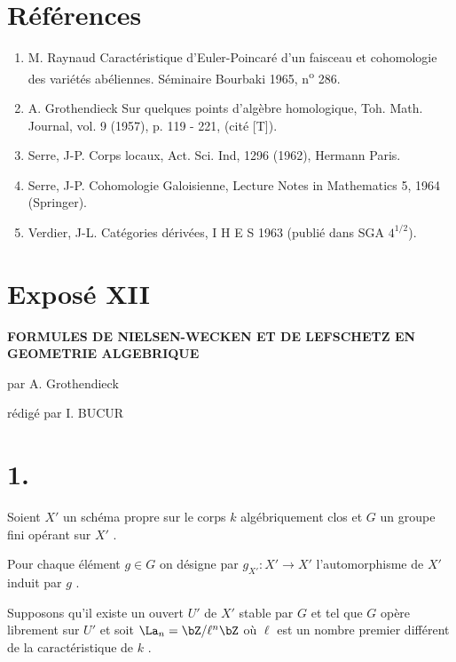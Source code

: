\section*{Références}

\begin{enumerate}
\item[{[1]}] M.
Raynaud Caractéristique d'Euler-Poincaré d'un faisceau et cohomologie des variétés abéliennes. Séminaire Bourbaki 1965, n\textsuperscript{o} 286.
\item[{[2]}] A. Grothendieck Sur quelques points d'algèbre homologique, Toh. Math. Journal, vol. 9 (1957), p. 119 - 221, (cité [T]).
\item[{[3]}] Serre, J-P. Corps locaux, Act. Sci. Ind, 1296 (1962), Hermann Paris.
\item[{[4]}] Serre, J-P. Cohomologie Galoisienne, Lecture Notes in Mathematics 5, 1964 (Springer).
\item[{[5]}] Verdier, J-L. Catégories dérivées, I H E S 1963 (publié dans SGA $4^{1/2}$).
\end{enumerate}

\renewcommand{\EP}{\operatorname{EP}}
\renewcommand{\Ob}{\operatorname{ob}}
\section*{Exposé XII}

\begin{center}
\Large\bf
FORMULES DE NIELSEN-WECKEN ET DE LEFSCHETZ EN GEOMETRIE ALGEBRIQUE
\end{center}

\begin{center}
par A. Grothendieck

rédigé par I. BUCUR
\end{center}

\bigskip

\section*{1.}
Soient $X'$ un schéma propre sur le corps $k$ algébriquement clos et $G$ un groupe fini opérant sur $X'$ .

Pour chaque élément $g \in G$ on désigne par $g_{X'} : X' \to X'$ l'automorphisme de $X'$ induit par $g$ .

Supposons qu'il existe un ouvert $U'$ de $X'$ stable par $G$ et tel que $G$ opère librement sur $U'$ et soit $\La_n = \bZ/\ell^n\bZ$ où $\ell$ est un nombre premier différent de la caractéristique de $k$ .

